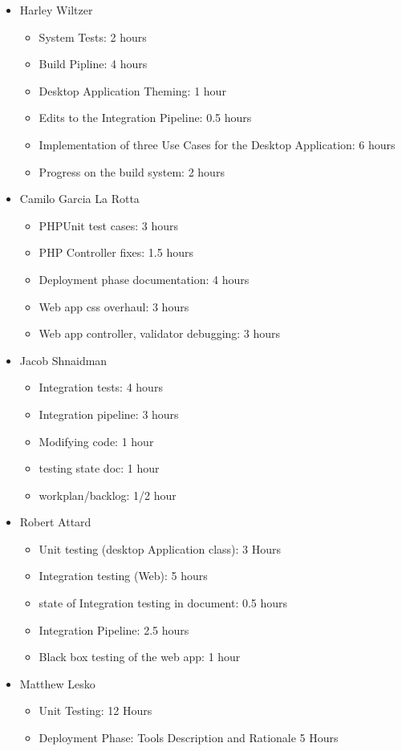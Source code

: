 \documentclass[12pt]{article}
\begin{document}
 \begin{itemize}
     \item Harley Wiltzer
        \begin{itemize}
            \item System Tests: 2 hours
            \item Build Pipline: 4 hours
            \item Desktop Application Theming: 1 hour
            \item Edits to the Integration Pipeline: 0.5 hours
            \item Implementation of three Use Cases for the Desktop Application: 6 hours
            \item Progress on the build system: 2 hours
        \end{itemize}
     \item Camilo Garcia La Rotta
     \begin{itemize}
         \item PHPUnit test cases: 3 hours
         \item PHP Controller fixes: 1.5 hours
         \item Deployment phase documentation: 4 hours
         \item Web app css overhaul: 3 hours
         \item Web app controller, validator debugging: 3 hours
     \end{itemize}
     \item Jacob Shnaidman
     \begin{itemize}
         \item Integration tests: 4 hours
         \item Integration pipeline: 3 hours
         \item Modifying code: 1 hour
         \item testing state doc: 1 hour
         \item workplan/backlog: 1/2 hour
     \end{itemize}
     \item Robert Attard
     \begin{itemize}
         \item Unit testing (desktop Application class): 3 Hours
         \item Integration testing (Web): 5 hours
         \item state of Integration testing in document: 0.5 hours
         \item Integration Pipeline: 2.5 hours 
         \item Black box testing of the web app: 1 hour
     \end{itemize}
     \item Matthew Lesko
     \begin{itemize}
        \item Unit Testing: 12 Hours
        \item Deployment Phase: Tools Description and Rationale 5 Hours
     \end{itemize}
 \end{itemize}
\end{document}
